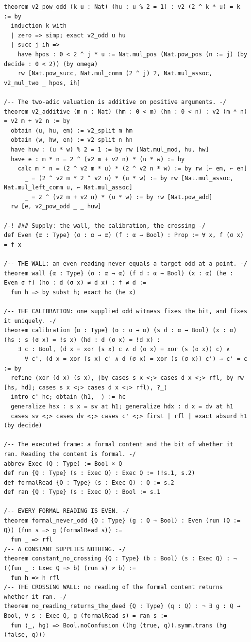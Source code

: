 \documentclass[10pt,twocolumn]{article}
\begin{document}
\begin{Verbatim}
theorem v2_pow_odd (k u : Nat) (hu : u % 2 = 1) : v2 (2 ^ k * u) = k := by
  induction k with
  | zero => simp; exact v2_odd u hu
  | succ j ih =>
    have hpos : 0 < 2 ^ j * u := Nat.mul_pos (Nat.pow_pos (n := j) (by decide : 0 < 2)) (by omega)
    rw [Nat.pow_succ, Nat.mul_comm (2 ^ j) 2, Nat.mul_assoc, v2_mul_two _ hpos, ih]

/-- The two-adic valuation is additive on positive arguments. -/
theorem v2_additive (m n : Nat) (hm : 0 < m) (hn : 0 < n) : v2 (m * n) = v2 m + v2 n := by
  obtain ⟨u, hu, em⟩ := v2_split m hm
  obtain ⟨w, hw, en⟩ := v2_split n hn
  have huw : (u * w) % 2 = 1 := by rw [Nat.mul_mod, hu, hw]
  have e : m * n = 2 ^ (v2 m + v2 n) * (u * w) := by
    calc m * n = (2 ^ v2 m * u) * (2 ^ v2 n * w) := by rw [← em, ← en]
      _ = (2 ^ v2 m * 2 ^ v2 n) * (u * w) := by rw [Nat.mul_assoc, Nat.mul_left_comm u, ← Nat.mul_assoc]
      _ = 2 ^ (v2 m + v2 n) * (u * w) := by rw [Nat.pow_add]
  rw [e, v2_pow_odd _ _ huw]

/-! ### Supply: the wall, the calibration, the crossing -/
def Even {α : Type} (σ : α → α) (f : α → Bool) : Prop := ∀ x, f (σ x) = f x

/-- THE WALL: an even reading never equals a target odd at a point. -/
theorem wall {α : Type} (σ : α → α) (f d : α → Bool) (x : α) (he : Even σ f) (ho : d (σ x) ≠ d x) : f ≠ d :=
  fun h => by subst h; exact ho (he x)

/-- THE CALIBRATION: one supplied odd witness fixes the bit, and fixes it uniquely. -/
theorem calibration {α : Type} (σ : α → α) (s d : α → Bool) (x : α) (hs : s (σ x) = !s x) (hd : d (σ x) = !d x) :
    ∃ c : Bool, (d x = xor (s x) c ∧ d (σ x) = xor (s (σ x)) c) ∧
      ∀ c', (d x = xor (s x) c' ∧ d (σ x) = xor (s (σ x)) c') → c' = c := by
  refine ⟨xor (d x) (s x), ⟨by cases s x <;> cases d x <;> rfl, by rw [hs, hd]; cases s x <;> cases d x <;> rfl⟩, ?_⟩
  intro c' hc; obtain ⟨h1, -⟩ := hc
  generalize hsx : s x = sv at h1; generalize hdx : d x = dv at h1
  cases sv <;> cases dv <;> cases c' <;> first | rfl | exact absurd h1 (by decide)

/-- The executed frame: a formal content and the bit of whether it ran. Reading the content is formal. -/
abbrev Exec (Q : Type) := Bool × Q
def run {Q : Type} (s : Exec Q) : Exec Q := (!s.1, s.2)
def formalRead {Q : Type} (s : Exec Q) : Q := s.2
def ran {Q : Type} (s : Exec Q) : Bool := s.1

/-- EVERY FORMAL READING IS EVEN. -/
theorem formal_never_odd {Q : Type} (g : Q → Bool) : Even (run (Q := Q)) (fun s => g (formalRead s)) :=
  fun _ => rfl
/-- A CONSTANT SUPPLIES NOTHING. -/
theorem constant_no_crossing {Q : Type} (b : Bool) (s : Exec Q) : ¬ ((fun _ : Exec Q => b) (run s) ≠ b) :=
  fun h => h rfl
/-- THE CROSSING WALL: no reading of the formal content returns whether it ran. -/
theorem no_reading_returns_the_deed {Q : Type} (q : Q) : ¬ ∃ g : Q → Bool, ∀ s : Exec Q, g (formalRead s) = ran s :=
  fun ⟨_, hg⟩ => Bool.noConfusion ((hg (true, q)).symm.trans (hg (false, q)))


\end{Verbatim}
\end{document}
